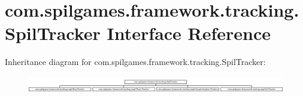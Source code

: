 \hypertarget{interfacecom_1_1spilgames_1_1framework_1_1tracking_1_1_spil_tracker}{\section{com.\-spilgames.\-framework.\-tracking.\-Spil\-Tracker Interface Reference}
\label{interfacecom_1_1spilgames_1_1framework_1_1tracking_1_1_spil_tracker}
}
Inheritance diagram for com.\-spilgames.\-framework.\-tracking.\-Spil\-Tracker\-:\begin{figure}[H]
\begin{center}
\leavevmode
\includegraphics[height=0.736842cm]{interfacecom_1_1spilgames_1_1framework_1_1tracking_1_1_spil_tracker}
\end{center}
\end{figure}
